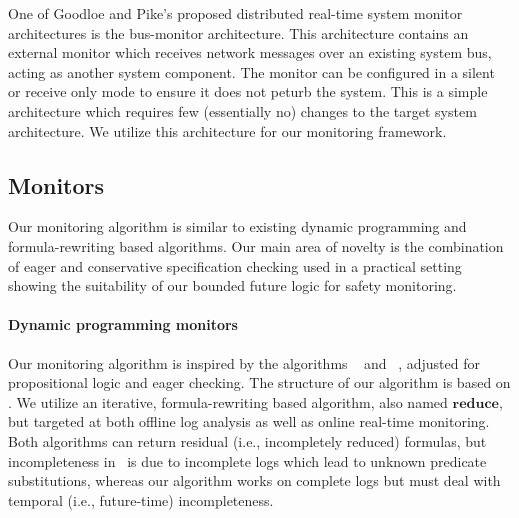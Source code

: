 One of Goodloe and Pike's proposed distributed real-time system monitor architectures is the bus-monitor architecture.
This architecture contains an external monitor which receives network messages over an existing system bus, acting as another system component.
The monitor can be configured in a silent or receive only mode to ensure it does not peturb the system. 
This is a simple architecture which requires few (essentially no) changes to the target system architecture. We utilize this architecture for our monitoring framework. 


\subsection{Monitors}
Our monitoring algorithm is similar to existing dynamic programming and formula-rewriting based algorithms. 
Our main area of novelty is the combination of eager and conservative specification checking used in a practical setting showing the suitability of our bounded future logic for safety monitoring.
\paragraph{Dynamic programming monitors}
Our monitoring algorithm is inspired by the algorithms \greduce\ \cite{Garg2011} and \precis\ \cite{Chowdhury2014}, adjusted for propositional logic and eager checking. 
The structure of our algorithm is based on \greduce{}. 
We utilize an iterative, formula-rewriting based algorithm, also named $\mathbf{reduce}$, but targeted at both offline log analysis as well as online real-time monitoring. 
Both algorithms can return residual (i.e., incompletely reduced) formulas, but incompleteness in \greduce\ is due to incomplete logs which lead to unknown predicate substitutions, whereas our algorithm works on complete logs but must deal with temporal (i.e., future-time) incompleteness. 

